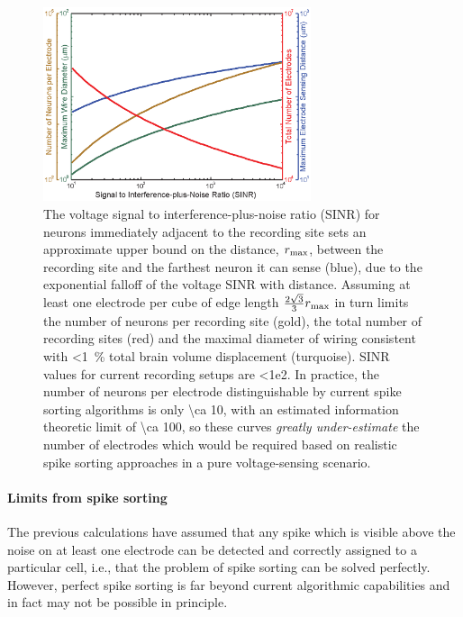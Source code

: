 \begin{figure}[htbp]
\caption{
The voltage signal to interference-plus-noise ratio (SINR) for neurons immediately adjacent to the recording site sets an approximate upper bound on the distance, $r_{\text{\scriptsize max}}$, between the recording site and the farthest neuron it can sense (blue), due to the exponential falloff of the voltage SINR with distance.
Assuming at least one electrode per cube of edge length $\frac{2\sqrt{3}}{3}r_{\text{\scriptsize max}}$ in turn limits the number of neurons per recording site (gold), the total number of recording sites (red) and the maximal diameter of wiring consistent with \SI{<1}{\percent} total brain volume displacement (turquoise).
SINR values for current recording setups are \num{<1e2}.
In practice, the number of neurons per electrode distinguishable by current spike sorting algorithms is only \num{\ca 10}, with an estimated information theoretic limit of \num{\ca 100}, so these curves \emph{greatly under-estimate} the number of electrodes which would be required based on realistic spike sorting approaches in a pure voltage-sensing scenario.
}
\label{fig:snrlimits}
\centering
\includegraphics[width=0.7\textwidth]{figs/Fig3.eps}
\end{figure}

\paragraph{Limits from spike sorting}

The previous calculations have assumed that any spike which is visible above the noise on at least one electrode can be detected and correctly assigned to a particular cell, i.e., that the problem of spike sorting can be solved perfectly.  
However, perfect spike sorting is far beyond current algorithmic capabilities and in fact may not be possible in principle. 

